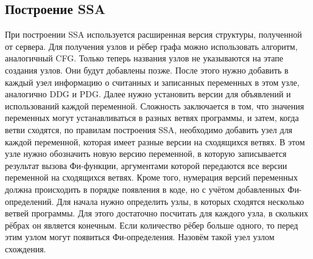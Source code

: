 \subsection{Построение SSA} \label{ch2:subsec-title-abbr}
При построении SSA используется расширенная версия структуры, полученной от сервера. Для получения узлов и рёбер графа можно использовать алгоритм, аналогичный CFG. Только теперь названия узлов не указываются на этапе создания узлов. Они будут добавлены позже. После этого нужно добавить в каждый узел информацию о считанных и записанных переменных в этом узле, аналогично DDG и PDG. Далее нужно установить версии для объявлений и использований каждой переменной.
Сложность заключается в том, что значения переменных могут устанавливаться в разных ветвях программы, и затем, когда ветви сходятся, по правилам построения SSA, необходимо добавить узел для каждой переменной, которая имеет разные версии на сходящихся ветвях. В этом узле нужно обозначить новую версию переменной, в которую записывается результат вызова Фи-функции, аргументами которой передаются все версии переменной на сходящихся ветвях. Кроме того, нумерация версий переменных должна происходить в порядке появления в коде, но с учётом добавленных Фи-определений.
Для начала нужно определить узлы, в которых сходятся несколько ветвей программы. Для этого достаточно посчитать для каждого узла, в скольких рёбрах он является конечным. Если количество рёбер больше одного, то перед этим узлом могут появиться Фи-определения. Назовём такой узел узлом схождения.
